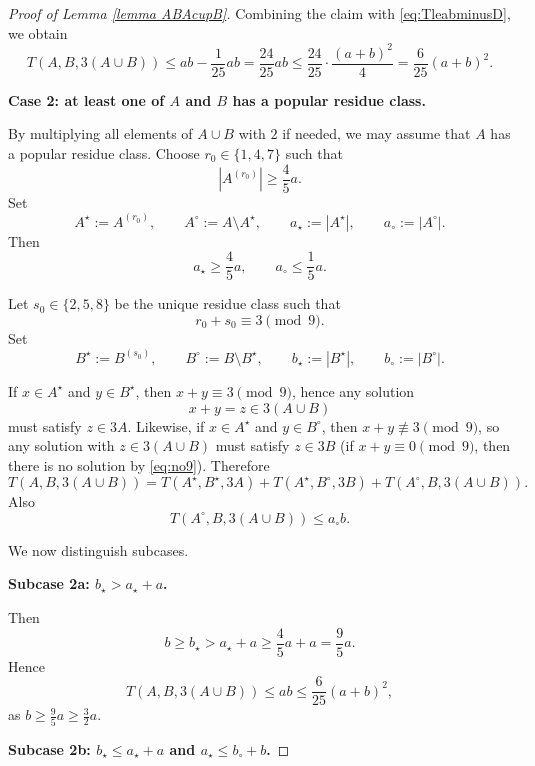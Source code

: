 \documentclass[10pt,a4paper]{amsart}
\begin{document}
\begin{proof}[Proof of Lemma \ref{lemma ABAcupB}]
Combining the claim with \eqref{eq:TleabminusD}, we obtain
\[
T(A,B,3(A\cup B))\le ab-\frac1{25}ab=\frac{24}{25}ab
\le \frac{24}{25}\cdot \frac{(a+b)^2}{4}
=\frac6{25}(a+b)^2.
\]

\medskip
\noindent\textbf{Case 2: at least one of $A$ and $B$ has a popular residue class.}

By multiplying all elements of $A\cup B$ with $2$ if needed, we may assume that $A$ has a popular residue class. Choose $r_0\in\{1,4,7\}$ such that
\[
|A^{(r_0)}|\ge \frac45a.
\]
Set
\[
A^{\star}:=A^{(r_0)},\qquad A^{\circ}:=A\setminus A^{\star},
\qquad a_{\star}:=|A^{\star}|,\qquad a_{\circ}:=|A^{\circ}|.
\]
Then
\begin{equation}
\label{eq:astar}
a_{\star}\ge \frac45a,\qquad a_{\circ}\le \frac15a.
\end{equation}

Let $s_0\in\{2,5,8\}$ be the unique residue class such that
\[
r_0+s_0\equiv 3\pmod 9.
\]
Set
\[
B^{\star}:=B^{(s_0)},\qquad B^{\circ}:=B\setminus B^{\star},
\qquad b_{\star}:=|B^{\star}|,\qquad b_{\circ}:=|B^{\circ}|.
\]

If $x\in A^{\star}$ and $y\in B^{\star}$, then $x+y\equiv 3\pmod 9$, hence any solution
\[
x+y=z\in 3(A\cup B)
\]
must satisfy $z\in 3A$. Likewise, if $x\in A^{\star}$ and $y\in B^{\circ}$, then $x+y\not\equiv 3\pmod 9$, so any solution with $z\in 3(A\cup B)$ must satisfy $z\in 3B$ (if $x+y\equiv 0\pmod 9$, then there is no solution by \eqref{eq:no9}). Therefore
\begin{equation}
\label{eq:decomp}
T(A,B,3(A\cup B))
=
T(A^{\star},B^{\star},3A)
+
T(A^{\star},B^{\circ},3B)
+
T(A^{\circ},B,3(A\cup B)).
\end{equation}
Also
\begin{equation}
\label{eq:lasttrivial}
T(A^{\circ},B,3(A\cup B))\le a_{\circ}b.
\end{equation}

We now distinguish subcases.

\medskip
\noindent\textbf{Subcase 2a: $b_{\star}>a_{\star}+a$.}

Then
\[
b\ge b_{\star}>a_{\star}+a\ge \frac45a+a=\frac95a.
\]
Hence
\[
T(A,B,3(A\cup B))\le ab\le \frac6{25}(a+b)^2,
\]
as $b\ge \frac95a\ge\frac32a$.

\medskip
\noindent\textbf{Subcase 2b: $b_{\star}\le a_{\star}+a$ and $a_{\star}\le b_{\circ}+b$.}


\end{proof}
\end{document}
